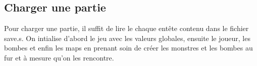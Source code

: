 \documentclass[12pt,a4paper]{article} %
\begin{document}
\subsection{Charger une partie}

Pour charger une partie, il suffit de lire le chaque entête contenu dans le fichier save.s. On intialise d'abord le jeu avec les valeurs globales, ensuite le joueur, les bombes et enfin les maps en prenant soin de créer les monstres et les bombes au fur et à mesure qu'on les rencontre.
\end{document}
